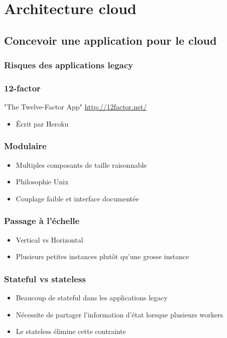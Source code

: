   \section{Architecture cloud}

  \subsection{Concevoir une application pour le cloud}

  \begin{frame}
    \frametitle{Risques des applications legacy}

  \end{frame}

  \begin{frame}
    \frametitle{12-factor}
    "The Twelve-Factor App" \url{http://12factor.net/}
    \begin{itemize}
      \item Écrit par Heroku
    \end{itemize}
  \end{frame}

  \begin{frame}
    \frametitle{Modulaire}
    \begin{itemize}
      \item Multiples composants de taille raisonnable
      \item Philosophie Unix
      \item Couplage faible et interface documentée
    \end{itemize}
  \end{frame}

  \begin{frame}
    \frametitle{Passage à l'échelle}
    \begin{itemize}
      \item Vertical vs Horizontal
      \item Plusieurs petites instances plutôt qu'une grosse instance
    \end{itemize}
  \end{frame}

  \begin{frame}
    \frametitle{Stateful vs stateless}
    \begin{itemize}
      \item Beaucoup de stateful dans les applications legacy
      \item Nécessite de partager l'information d'état lorsque plusieurs workers
      \item Le stateless élimine cette contrainte
    \end{itemize}
  \end{frame}

